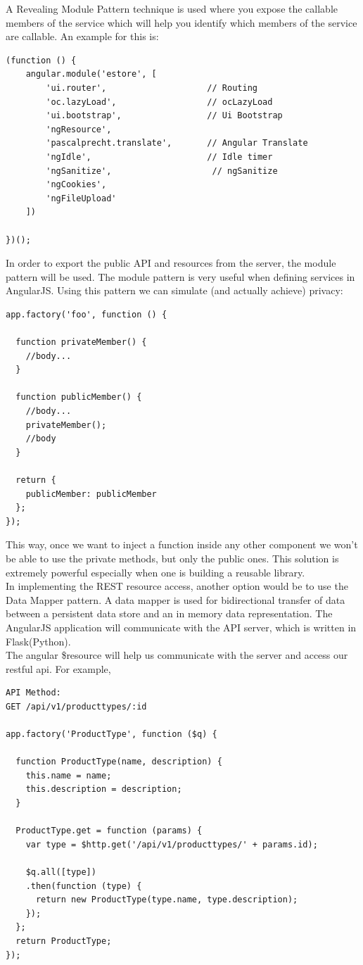 \documentclass{report}
\begin{document}
A Revealing Module Pattern technique is used where you expose the callable members of the service which will help you identify which members of the service are callable. An example for this is:
\begin{lstlisting}[basicstyle=\footnotesize,frame=single,]
(function () {
    angular.module('estore', [
        'ui.router',                    // Routing
        'oc.lazyLoad',                  // ocLazyLoad
        'ui.bootstrap',                 // Ui Bootstrap
        'ngResource',
        'pascalprecht.translate',       // Angular Translate
        'ngIdle',                       // Idle timer
        'ngSanitize',                    // ngSanitize
        'ngCookies',
        'ngFileUpload'
    ])

})();
\end{lstlisting}
In order to export the public API and resources from the server, the module pattern will be used. The module pattern  is very useful when defining services in AngularJS. Using this pattern we can simulate (and actually achieve) privacy:
\begin{lstlisting}[basicstyle=\footnotesize,frame=single,]
app.factory('foo', function () {

  function privateMember() {
    //body...
  }

  function publicMember() {
    //body...
    privateMember();
    //body
  }

  return {
    publicMember: publicMember
  };
});
\end{lstlisting}
This way, once we want to inject a function inside any other component we won't be able to use the private methods, but only the public ones. This solution is extremely powerful especially when one is building a reusable library. \\
In implementing the REST resource access, another option would be to use the Data Mapper pattern. A data mapper is used for bidirectional transfer of data between a persistent data store and an in memory data representation. The AngularJS application will communicate with the API server, which is written in Flask(Python).\\
The angular \$resource will help us communicate with the server and access our restful api. For example,
\begin{lstlisting}[basicstyle=\footnotesize,frame=single,]
API Method:
GET /api/v1/producttypes/:id

app.factory('ProductType', function ($q) {

  function ProductType(name, description) {
    this.name = name;
    this.description = description;
  }

  ProductType.get = function (params) {
    var type = $http.get('/api/v1/producttypes/' + params.id);
   
    $q.all([type])
    .then(function (type) {
      return new ProductType(type.name, type.description);
    });
  };
  return ProductType;
});
\end{lstlisting}
\end{document}
